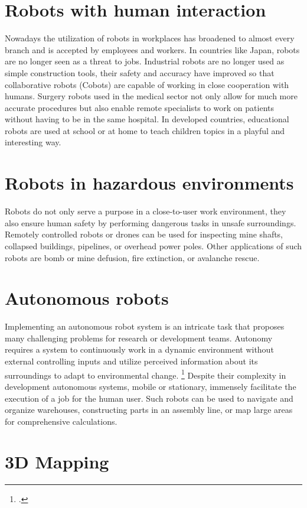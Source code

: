 \section{Robots with human interaction}
Nowadays the utilization of robots in workplaces has broadened to almost every branch and is accepted by employees and workers. In countries like Japan, robots are no longer seen as a threat to jobs. 
Industrial robots are no longer used as simple construction tools, their safety and accuracy have improved so that collaborative robots (Cobots) are capable of working in close cooperation with humans. 
Surgery robots used in the medical sector not only allow for much more accurate procedures but also enable remote specialists to work on patients without having to be in the same hospital. 
In developed countries, educational robots are used at school or at home to teach children topics in a playful and interesting way.

\section{Robots in hazardous environments}
Robots do not only serve a purpose in a close-to-user work environment, they also ensure human safety by performing dangerous tasks in unsafe surroundings. 
Remotely controlled robots or drones can be used for inspecting mine shafts, collapsed buildings, pipelines, or overhead power poles.
Other applications of such robots are bomb or mine defusion, fire extinction, or avalanche rescue.

\section{Autonomous robots}
Implementing an autonomous robot system is an intricate task that proposes many challenging problems for research or development teams. Autonomy requires a system to continuously work in a dynamic environment without external controlling inputs and utilize perceived information about its surroundings to adapt to environmental change. \footcite[Pages 1-2]{bekey2005autonomous}
Despite their complexity in development autonomous systems, mobile or stationary, immensely facilitate the execution of a job for the human user.
Such robots can be used to navigate and organize warehouses, constructing parts in an assembly line, or map large areas for comprehensive calculations.

\section{3D Mapping}


